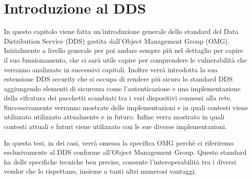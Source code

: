 \chapter{Introduzione al DDS}
In questo capitolo viene fatta un'introduzione generale dello 
standard del Data Distribution Service (DDS) gestita
dall'Object Management Group (OMG). Inizialmente a livello generale 
per poi andare sempre più nel
dettaglio per capire il suo funzionamento, che ci sarà utile 
capire per comprendere le vulnerabilità che verranno analizzate in
successivi capitoli. Inoltre verrà introdotta la sua estensione
DDS security che si occupa di rendere più sicuro lo standard DDS 
aggiungendo elementi di sicurezza come l'autenticazione e una 
implementazione della cifratura dei pacchetti scambiati tra i vari
dispositivi connessi alla rete. Successivamente verranno mostrate delle 
implementazioni e in quali contesti viene utilizzato utilizzato
attualmente e in futuro. 
Infine verra mostrato in quali contesti attuali e futuri viene
utilizzato con le sue diverse implementazioni.

In questa tesi, in dei casi, verrà omessa la specifica OMG perchè 
ci riferiremo
esclusivamente al DDS conforme all'Object Management Group. Questo 
standard ha delle specifiche tecniche ben precise, consente
l'interoperabilità tra i diversi vendor che lo rispettano, insieme
a tanti altri numerosi vantaggi.
\cite{dds1.4}


